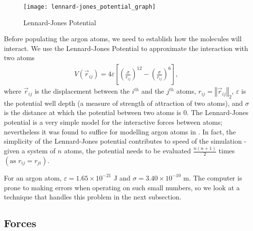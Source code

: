 \documentclass[../Main.tex]{subfiles}
\begin{document}
\begin{wrapfigure}[16]{r}{0.5\textwidth}
\centering
\texttt{[image: lennard-jones\_potential\_graph]}
\caption{Lennard-Jones Potential}
\label{fig:lennard-jones_potential}
\end{wrapfigure}

Before populating the argon atoms, we need to establish how the molecules will interact. We use the Lennard-Jones Potential to approximate the interaction with two atoms
\begin{align}
	V\left(\vec{r}_{ij}\right) = 4\varepsilon \left[ \left( \frac{\sigma}{r_{ij}}\right)^{12} - \left( \frac{\sigma}{r_{ij}}\right)^{6} \right], \label{eqn:lennard-jones_potential}
\end{align}
where $\vec{r}_{ij}$ is the displacement between the $i^{th}$ and the $j^{th}$ atoms, $r_{ij} = \left\Vert\vec{r}_{ij}\right\Vert_{2}$, $\varepsilon$ is the potential well depth (a measure of strength of attraction of two atoms), and $\sigma$ is the distance at which the potential between two atoms is 0. The Lennard-Jones potential is a very simple model for the interactive forces between atoms; nevertheless it was found to suffice for modelling argon atoms in \cite{Rahman1964}. In fact, the simplicity of the Lennard-Jones potential contributes to speed of the simulation - given a system of $n$ atoms, the potential needs to be evaluated $\frac{n\left(n+1\right)}{2}$ times $\left(\mbox{as }r_{ij} = r_{ji}\right)$.

For an argon atom, $\varepsilon = 1.65 \times 10^{-21}$ J and $\sigma = 3.40 \times 10^{-10}$ m. The computer is prone to making errors when operating on such small numbers, so we look at a technique that handles this problem in the next subsection.

\subsection{Forces}
\end{document}
